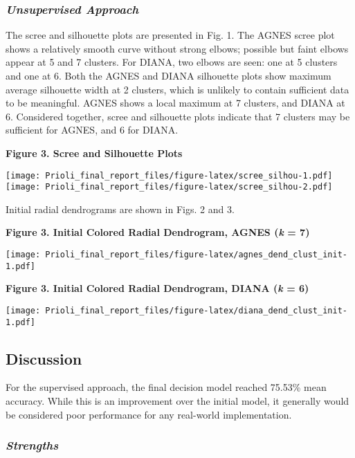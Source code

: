 \documentclass[]{article}
\begin{document}
\hypertarget{unsupervised-approach-1}{%
\subsubsection{\texorpdfstring{\emph{Unsupervised
Approach}}{Unsupervised Approach}}\label{unsupervised-approach-1}}

The scree and silhouette plots are presented in Fig. 1. The AGNES scree
plot shows a relatively smooth curve without strong elbows; possible but
faint elbows appear at 5 and 7 clusters. For DIANA, two elbows are seen:
one at 5 clusters and one at 6. Both the AGNES and DIANA silhouette
plots show maximum average silhouette width at 2 clusters, which is
unlikely to contain sufficient data to be meaningful. AGNES shows a
local maximum at 7 clusters, and DIANA at 6. Considered together, scree
and silhouette plots indicate that 7 clusters may be sufficient for
AGNES, and 6 for DIANA.

\textbf{Figure 3. Scree and Silhouette Plots}

\texttt{[image: Prioli\_final\_report\_files/figure-latex/scree\_silhou-1.pdf]}
\texttt{[image: Prioli\_final\_report\_files/figure-latex/scree\_silhou-2.pdf]}

Initial radial dendrograms are shown in Figs. 2 and 3.

\textbf{Figure 3. Initial Colored Radial Dendrogram, AGNES (\emph{k} =
7)}

\texttt{[image: Prioli\_final\_report\_files/figure-latex/agnes\_dend\_clust\_init-1.pdf]}

\textbf{Figure 3. Initial Colored Radial Dendrogram, DIANA (\emph{k} =
6)}

\texttt{[image: Prioli\_final\_report\_files/figure-latex/diana\_dend\_clust\_init-1.pdf]}

\hypertarget{discussion}{%
\subsection{\texorpdfstring{\textbf{Discussion}}{Discussion}}\label{discussion}}

For the supervised approach, the final decision model reached 75.53\%
mean accuracy. While this is an improvement over the initial model, it
generally would be considered poor performance for any real-world
implementation.

\hypertarget{strengths}{%
\subsubsection{\texorpdfstring{\emph{Strengths}}{Strengths}}\label{strengths}}
\end{document}

